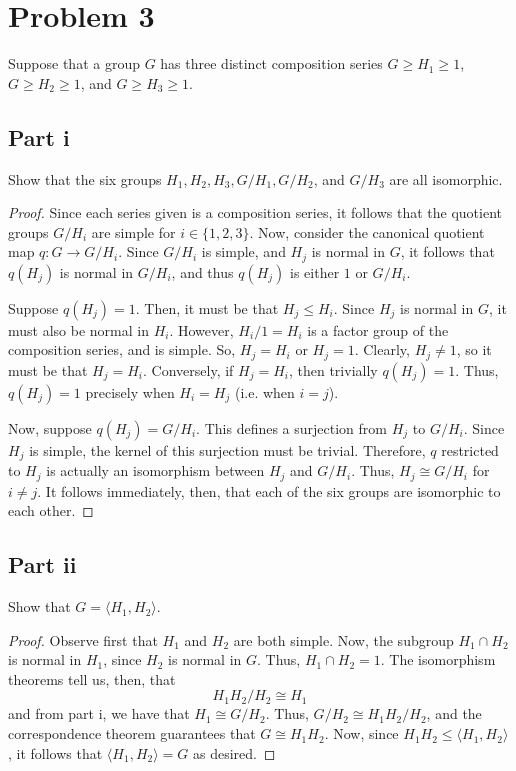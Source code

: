 \documentclass[12pt,reqno]{amsart}
\begin{document}
\newpage

\section*{Problem 3}
Suppose that a group $G$ has three distinct composition series $G\geq H_1\geq
1$, $G\geq H_2\geq 1$, and $G\geq H_3\geq 1$.

\subsection*{Part i}
Show that the six groups $H_1,H_2,H_3,G/{H_1},G/{H_2}$, and $G/{H_3}$ are all
isomorphic.
\\
\begin{proof}
Since each series given is a composition series, it follows that the quotient
    groups $G/{H_i}$ are simple for $i\in\{1,2,3\}$. Now, consider the canonical
    quotient map $q:G\to G/{H_i}$. Since $G/{H_i}$ is simple, and $H_j$ is
    normal in $G$, it follows that $q(H_j)$ is normal in $G/{H_i}$, and thus
    $q(H_j)$ is either $1$ or $G/{H_i}$.

    Suppose $q(H_j) = 1$. Then, it must be that $H_j\leq H_i$. Since $H_j$ is
    normal in $G$, it must also be normal in $H_i$. However, $H_i/1=H_i$ is a
    factor group of the composition series, and is simple. So, $H_j=H_i$ or
    $H_j=1$. Clearly, $H_j\neq 1$, so it must be that $H_j=H_i$.
    Conversely, if $H_j=H_i$, then trivially $q(H_j)=1$. Thus, $q(H_j)=1$
    precisely when $H_i=H_j$ (i.e. when $i=j$).

    Now, suppose $q(H_j)=G/{H_i}$. This defines a surjection from $H_j$ to
    $G/{H_i}$. Since $H_j$ is simple, the kernel of this surjection must be
    trivial. Therefore, $q$ restricted to $H_j$ is actually an isomorphism
    between $H_j$ and $G/{H_i}$. Thus, $H_j\cong G/{H_i}$ for $i\neq j$. It
    follows immediately, then, that each of the six groups are isomorphic to
    each other.
\end{proof}

\subsection*{Part ii}
Show that $G=\langle H_1,H_2\rangle$.
\\
\begin{proof}
    Observe first that $H_1$ and $H_2$ are both simple. Now, the subgroup $H_1\cap
    H_2$ is normal in $H_1$, since $H_2$ is normal in $G$. Thus, $H_1\cap H_2 =
    1$. The isomorphism theorems tell us, then, that
    \[
        H_1H_2/{H_2}\cong H_1
    \]
    and from part i, we have that $H_1\cong G/{H_2}$. Thus, $G/{H_2}\cong
    H_1H_2/{H_2}$, and the correspondence theorem guarantees that $G\cong
    H_1H_2$. Now, since $H_1H_2\leq \langle H_1,H_2\rangle$, it follows that
    $\langle H_1,H_2\rangle = G$ as desired.
\end{proof}
\end{document}
